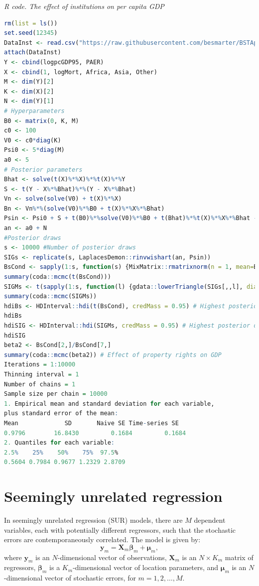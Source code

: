 \begin{tcolorbox}[enhanced,width=4.67in,center upper,
	fontupper=\large\bfseries,drop shadow southwest,sharp corners]
	\textit{R code. The effect of institutions on per capita GDP}
	\begin{VF}
		\begin{lstlisting}[language=R]
rm(list = ls())
set.seed(12345)
DataInst <- read.csv("https://raw.githubusercontent.com/besmarter/BSTApp/refs/heads/master/DataApp/4Institutions.csv", sep = ",", header = TRUE, quote = "")
attach(DataInst)
Y <- cbind(logpcGDP95, PAER)
X <- cbind(1, logMort, Africa, Asia, Other)
M <- dim(Y)[2]
K <- dim(X)[2]
N <- dim(Y)[1]
# Hyperparameters
B0 <- matrix(0, K, M)
c0 <- 100
V0 <- c0*diag(K)
Psi0 <- 5*diag(M)
a0 <- 5
# Posterior parameters
Bhat <- solve(t(X)%*%X)%*%t(X)%*%Y 
S <- t(Y - X%*%Bhat)%*%(Y - X%*%Bhat)
Vn <- solve(solve(V0) + t(X)%*%X) 
Bn <- Vn%*%(solve(V0)%*%B0 + t(X)%*%X%*%Bhat)
Psin <- Psi0 + S + t(B0)%*%solve(V0)%*%B0 + t(Bhat)%*%t(X)%*%X%*%Bhat - t(Bn)%*%solve(Vn)%*%Bn
an <- a0 + N
#Posterior draws
s <- 10000 #Number of posterior draws
SIGs <- replicate(s, LaplacesDemon::rinvwishart(an, Psin))
BsCond <- sapply(1:s, function(s) {MixMatrix::rmatrixnorm(n = 1, mean=Bn, U = Vn,V = SIGs[,,s])})
summary(coda::mcmc(t(BsCond)))
SIGMs <- t(sapply(1:s, function(l) {gdata::lowerTriangle(SIGs[,,l], diag=TRUE, byrow=FALSE)}))
summary(coda::mcmc(SIGMs))
hdiBs <- HDInterval::hdi(t(BsCond), credMass = 0.95) # Highest posterior density credible interval
hdiBs
hdiSIG <- HDInterval::hdi(SIGMs, credMass = 0.95) # Highest posterior density credible interval
hdiSIG
beta2 <- BsCond[2,]/BsCond[7,] 
summary(coda::mcmc(beta2)) # Effect of property rights on GDP
Iterations = 1:10000
Thinning interval = 1 
Number of chains = 1 
Sample size per chain = 10000 
1. Empirical mean and standard deviation for each variable,
plus standard error of the mean:
Mean             SD       Naive SE Time-series SE 
0.9796        16.8430         0.1684         0.1684 
2. Quantiles for each variable:
2.5%    25%    50%    75%  97.5% 
0.5604 0.7984 0.9677 1.2329 2.8709 
\end{lstlisting}
	\end{VF}
\end{tcolorbox} 

\section{Seemingly unrelated regression}\label{sec72}

In seemingly unrelated regression (SUR) models, there are $M$ dependent variables, each with potentially different regressors, such that the stochastic errors are contemporaneously correlated. The model is given by:
\[
\bm{y}_m = \bm{X}_m \bm{\beta}_m + \bm{\mu}_m,
\]
where $\bm{y}_m$ is an $N$-dimensional vector of observations, $\bm{X}_m$ is an $N \times K_m$ matrix of regressors, $\bm{\beta}_m$ is a $K_m$-dimensional vector of location parameters, and $\bm{\mu}_m$ is an $N$-dimensional vector of stochastic errors, for $m = 1, 2, \dots, M$.

